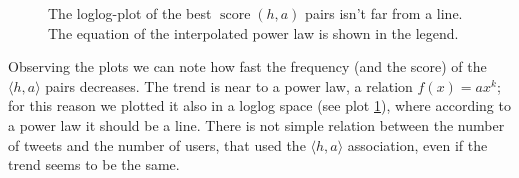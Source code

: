 \documentclass[a4paper,11pt,oneside]{article}
\DeclareMathOperator{\score}{score}
\newcommand{\ha}{$\langle h,a \rangle$\xspace}
\newcommand{\sha}{$\score(h,a)$\xspace}
\begin{document}
\begin{figure}[h!]
\centering
{}
\caption{The loglog-plot of the best \sha pairs isn't far from a line. The equation of the interpolated power law is shown in the legend.}
\label{fig:loglogPlot}
\end{figure}

Observing the plots we can note how fast the frequency (and the score) of the \ha pairs decreases. The trend is near to a power law, a relation $f(x) = ax^k$; for this reason we plotted it also in a loglog space (see plot \ref{fig:loglogPlot}), where according to a power law it should be a line.
There is not simple relation between the number of tweets and the number of users, that used the \ha association, even if the trend seems to be the same.


\end{document}
